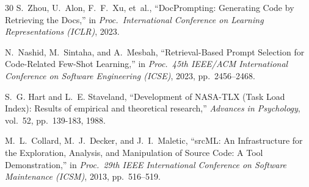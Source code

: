 \documentclass[conference]{IEEEtran}
\begin{document}
\begin{thebibliography}{30}
S.~Zhou, U.~Alon, F.~F.~Xu, et~al.,
``DocPrompting: Generating Code by Retrieving the Docs,''
in \emph{Proc.\ International Conference on Learning Representations (ICLR)}, 2023.

N.~Nashid, M.~Sintaha, and A.~Mesbah,
``Retrieval-Based Prompt Selection for Code-Related Few-Shot Learning,''
in \emph{Proc.\ 45th IEEE/ACM International Conference on Software Engineering (ICSE)}, 2023, pp.~2456--2468.

S.~G. Hart and L.~E. Staveland, ``Development of NASA-TLX (Task Load Index): Results of empirical and theoretical research,'' \emph{Advances in Psychology}, vol.~52, pp.~139-183, 1988.

M.~L.~Collard, M.~J.~Decker, and J.~I.~Maletic,
``srcML: An Infrastructure for the Exploration, Analysis, and Manipulation of Source Code: A Tool Demonstration,''
in \emph{Proc.\ 29th IEEE International Conference on Software Maintenance (ICSM)}, 2013, pp.~516--519.

\end{thebibliography}
\end{document}
